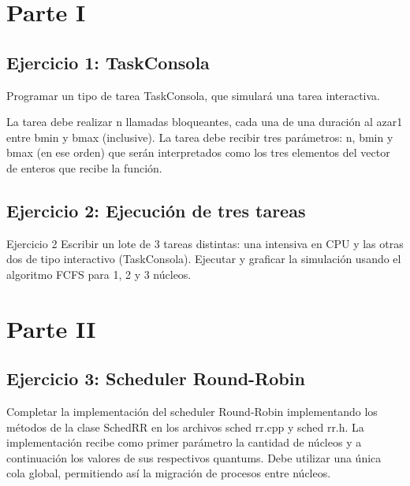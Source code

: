 \documentclass[a4paper]{article}
\begin{document}
\thispagestyle{empty}

\maketitle
\newpage

\thispagestyle{empty}
\vfill
\begin{abstract}
En el presente trabajo se describe la problemática de ...
\end{abstract}

\thispagestyle{empty}
\vspace{3cm}
\tableofcontents
\newpage


\newpage
\section{Parte I}

\subsection{Ejercicio 1: TaskConsola}
Programar un tipo de tarea TaskConsola, que simular\'a una tarea interactiva.

La tarea debe realizar n llamadas bloqueantes, cada una de una duraci\'on al azar1 entre bmin y bmax (inclusive). La tarea debe recibir tres par\'ametros: n, bmin y bmax (en ese orden) que ser\'an interpretados como los tres elementos del vector de enteros que recibe la funci\'on.



\subsection{Ejercicio 2: Ejecuci\'on de tres tareas}
Ejercicio 2 Escribir un lote de 3 tareas distintas: una intensiva en CPU y las otras dos de tipo interactivo (TaskConsola). Ejecutar y graficar la simulaci\'on usando el algoritmo FCFS para 1, 2 y 3 n\'ucleos.



\section{Parte II}


\subsection{Ejercicio 3: Scheduler Round-Robin}
Completar la implementaci\'on del scheduler Round-Robin implementando los m\'etodos de la clase SchedRR en los archivos sched rr.cpp y sched rr.h. 
La implementaci\'on recibe como primer par\'ametro la cantidad de n\'ucleos y a continuaci\'on los valores de sus respectivos quantums. 
Debe utilizar una \'unica cola global, permitiendo as\'i la migraci\'on de procesos entre n\'ucleos.
 
\end{document}
